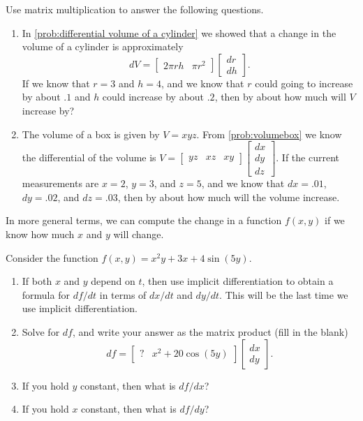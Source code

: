 \begin{problem}
Use matrix multiplication to answer the following questions.
\begin{enumerate}
 \item {}%
 In \ref{prob:differential volume of a cylinder} we showed that a change in the volume of a cylinder is approximately
 $$dV = \begin{bmatrix}2\pi rh& \pi r^2\end{bmatrix}\begin{bmatrix}dr\\dh\end{bmatrix}.$$ 
 If we know that $r=3$ and $h=4$, and we know that $r$ could going to increase by about $.1$ and $h$ could increase by about $.2$, then by about how much will $V$ increase by? 
 \item The volume of a box is given by $V=xyz$. From \ref{prob:volumebox} we know the differential of the volume is $V=\begin{bmatrix}yz& xz & xy\end{bmatrix}\begin{bmatrix}dx\\dy\\dz\end{bmatrix}$. If the current measurements are $x=2$, $y=3$, and $z=5$, and we know that $dx=.01$, $dy=.02$, and $dz=.03$, then by about how much will the volume increase.  
\end{enumerate}
\end{problem}

In more general terms, we can compute the change in a function $f(x,y)$ if we know how much $x$ and $y$ will change. 

\begin{problem}\label{unit6_content}
 Consider the function $f(x,y) = x^2y +3x+4\sin(5y)$.  
\begin{enumerate}
 \item If both $x$ and $y$ depend on $t$, then use implicit differentiation to obtain a formula for $df/dt$ in terms of $dx/dt$ and $dy/dt$. This will be the last time we use implicit differentiation.
 \item Solve for $df$, and write your answer as the matrix product (fill in the blank) 
 $$df = \begin{bmatrix}?& x^2+20\cos(5y)\end{bmatrix}\begin{bmatrix}dx\\dy\end{bmatrix}.$$ 
 \item If you hold $y$ constant, then what is $df/dx$? 
 \item If you hold $x$ constant, then what is $df/dy$? 
\end{enumerate}
\end{problem}

